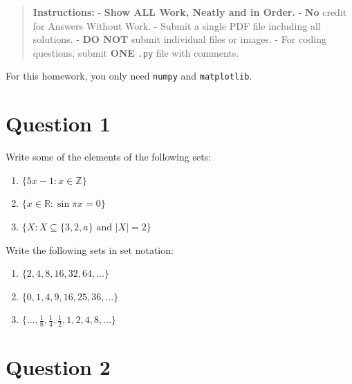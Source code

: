 \documentclass[
  letterpaper,
  DIV=11,
  numbers=noendperiod]{scrreprt}
\providecommand{\tightlist}{%
  \setlength{\itemsep}{0pt}\setlength{\parskip}{0pt}}\usepackage{longtable,booktabs,array}
\begin{document}
\begin{quote}
\textbf{Instructions:} - \textbf{Show ALL Work, Neatly and in Order.} -
\textbf{No} credit for Answers Without Work. - Submit a single PDF file
including all solutions. - \textbf{DO NOT} submit individual files or
images. - For coding questions, submit \textbf{ONE} \texttt{.py} file
with comments.
\end{quote}

\begin{tcolorbox}[enhanced jigsaw, toprule=.15mm, leftrule=.75mm, coltitle=black, left=2mm, opacityback=0, titlerule=0mm, arc=.35mm, toptitle=1mm, opacitybacktitle=0.6, bottomtitle=1mm, colframe=quarto-callout-note-color-frame, title=\textcolor{quarto-callout-note-color}{\faInfo}\hspace{0.5em}{Note}, rightrule=.15mm, bottomrule=.15mm, colbacktitle=quarto-callout-note-color!10!white, breakable, colback=white]

For this homework, you only need \texttt{numpy} and \texttt{matplotlib}.

\end{tcolorbox}

\section{Question 1}\label{question-1}

Write some of the elements of the following sets:

\begin{enumerate}
\def\labelenumi{\arabic{enumi}.}
\tightlist
\item
  \(\{ 5x-1: x \in \mathbb{Z} \}\)
\item
  \(\{ x \in \mathbb{R}: \sin \pi x = 0 \}\)
\item
  \(\{X : X \subseteq \{3,2,a\} \text{ and } |X|=2 \}\)
\end{enumerate}

Write the following sets in set notation:

\begin{enumerate}
\def\labelenumi{\arabic{enumi}.}
\setcounter{enumi}{3}
\tightlist
\item
  \(\{ 2, 4, 8, 16, 32, 64, ...\}\)
\item
  \(\{0,1,4,9,16,25,36, ...\}\)
\item
  \(\{..., \frac{1}{8},\frac{1}{4},\frac{1}{2},1,2,4,8,... \}\)
\end{enumerate}

\section{Question 2}\label{question-2}
\end{document}
